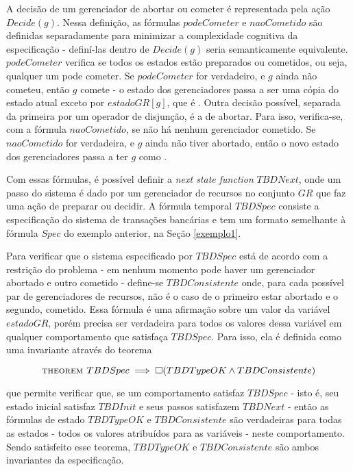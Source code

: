 A decisão de um gerenciador de abortar ou cometer é representada pela ação $Decide(g)$. Nessa definição, as fórmulas $podeCometer$ e $naoCometido$ são definidas separadamente para minimizar a complexidade cognitiva da especificação - definí-las dentro de $Decide(g)$ seria semanticamente equivalente. $podeCometer$ verifica se todos os estados estão preparados ou cometidos, ou seja, qualquer um pode cometer. Se $podeCometer$ for verdadeiro, e $g$ ainda não cometeu, então $g$ comete - o estado dos gerenciadores passa a ser uma cópia do estado atual exceto por $estadoGR[g]$, que é \cometido. Outra decisão possível, separada da primeira por um operador de disjunção, é a de abortar. Para isso, verifica-se, com a fórmula $naoCometido$, se não há nenhum gerenciador cometido. Se $naoCometido$ for verdadeira, e $g$ ainda não tiver abortado, então o novo estado dos gerenciadores passa a ter $g$ como \abortado.

Com essas fórmulas, é possível definir a \textit{next state function} $TBDNext$, onde um passo do sistema é dado por um gerenciador de recursos no conjunto $GR$ que faz uma ação de preparar ou decidir. A fórmula temporal $TBDSpec$ consiste a especificação do sistema de transações bancárias e tem um formato semelhante à fórmula $Spec$ do exemplo anterior, na Seção \ref{exemplo1}.

Para verificar que o sistema especificado por $TBDSpec$ está de acordo com a restrição do problema - em nenhum momento pode haver um gerenciador abortado e outro cometido - define-se $TBDConsistente$ onde, para cada possível par de gerenciadores de recursos, não é o caso de o primeiro estar abortado e o segundo, cometido. Essa fórmula é uma afirmação sobre um valor da variável $estadoGR$, porém precisa ser verdadeira para todos os valores dessa variável em qualquer comportamento que satisfaça $TBDSpec$. Para isso, ela é definida como uma invariante através do teorema

\[\textsc{theorem } TBDSpec \implies \square(TBDTypeOK \land TBDConsistente)\]

que permite verificar que, se um comportamento satisfaz $TBDSpec$ - isto é, seu estado inicial satisfaz $TBDInit$ e seus passos satisfazem $TBDNext$ - então as fórmulas de estado $TBDTypeOK$ e $TBDConsistente$ são verdadeiras para todas as estados - todos os valores atribuídos para as variáveis - neste comportamento. Sendo satisfeito esse teorema, $TBDTypeOK$ e $TBDConsistente$ são ambos invariantes da especificação.

